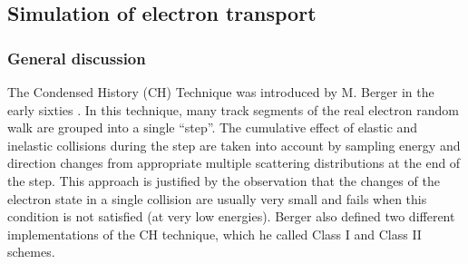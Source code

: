 
%
%
%
%
%
%
%
%
%


\subsection{Simulation of electron transport}

\label{chapter_electron_transport}

\subsubsection{General discussion}
\label{electron_general}
\setcounter{equation}{0}

The Condensed History (CH) Technique was introduced by M. Berger in
the early sixties \cite{Be63}.
In this technique, many track segments of the real electron random
walk are grouped into a single ``step''. The cumulative effect
of elastic and inelastic collisions during the step are taken into
account by sampling energy and direction changes from
appropriate multiple scattering distributions at the end of the step.
This approach is justified by the observation that the changes of
the electron state in a single collision are usually very small and
fails when this condition is not satisfied (at very low energies).
Berger also defined two different implementations of the CH technique,
which he called Class I and Class II schemes.

